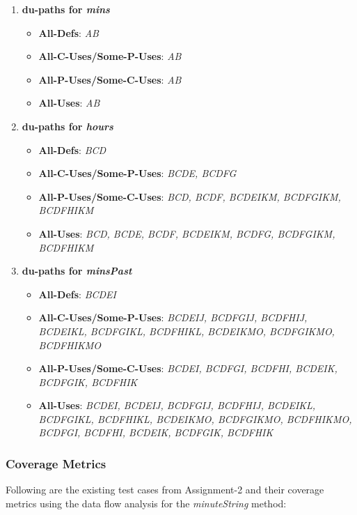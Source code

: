 \documentclass[fontsize=12pt,paper=letter,twoside]{scrartcl}
\begin{document}
\begin{enumerate}
\item \textbf{du-paths for \emph{mins}}
\begin{itemize}
\item \textbf{All-Defs}: \emph{AB}
\item \textbf{All-C-Uses/Some-P-Uses}: \emph{AB}
\item \textbf{All-P-Uses/Some-C-Uses}: \emph{AB}
\item \textbf{All-Uses}: \emph{AB}
\end{itemize}

\item \textbf{du-paths for \emph{hours}}
\begin{itemize}
\item \textbf{All-Defs}: \emph{BCD}
\item \textbf{All-C-Uses/Some-P-Uses}: \emph{BCDE, BCDFG}
\item \textbf{All-P-Uses/Some-C-Uses}: \emph{BCD, BCDF, BCDEIKM, BCDFGIKM, BCDFHIKM}
\item \textbf{All-Uses}: \emph{BCD, BCDE, BCDF, BCDEIKM, BCDFG, BCDFGIKM, BCDFHIKM}
\end{itemize}

\item \textbf{du-paths for \emph{minsPast}}
\begin{itemize}
\item \textbf{All-Defs}: \emph{BCDEI}
\item \textbf{All-C-Uses/Some-P-Uses}: \emph{BCDEIJ, BCDFGIJ, BCDFHIJ, BCDEIKL, BCDFGIKL, BCDFHIKL, BCDEIKMO, BCDFGIKMO, BCDFHIKMO}
\item \textbf{All-P-Uses/Some-C-Uses}: \emph{BCDEI, BCDFGI, BCDFHI, BCDEIK, BCDFGIK, BCDFHIK}
\item \textbf{All-Uses}: \emph{BCDEI, BCDEIJ, BCDFGIJ, BCDFHIJ, BCDEIKL, BCDFGIKL, BCDFHIKL, BCDEIKMO, BCDFGIKMO, BCDFHIKMO, BCDFGI, BCDFHI, BCDEIK, BCDFGIK, BCDFHIK}
\end{itemize}

\end{enumerate}


\subsubsection{Coverage Metrics}

Following are the existing test cases from Assignment-2 and their coverage metrics using the data flow analysis for the \emph{minuteString} method:
\end{document}
